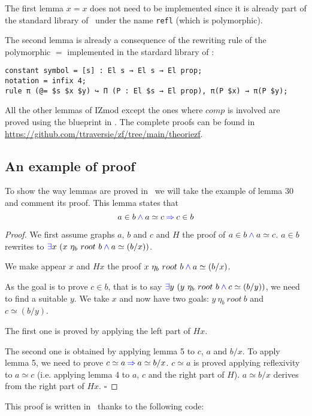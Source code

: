 \documentclass[a4paper]{article}
\begin{document}
The first lemma $x=x$ does not need to be implemented since it is already part of the standard library of \dedukti \ under the name \texttt{refl} (which is polymorphic).

The second lemma is already a consequence of the rewriting rule of the polymorphic $=$ implemented in the stardard library of \dedukti: 
\begin{lstlisting}
constant symbol = [s] : El s → El s → El prop;
notation = infix 4;
rule π (@= $s $x $y) ↪ Π (P : El $s → El prop), π(P $x) → π(P $y);
\end{lstlisting}

All the other lemmas of IZmod except the ones where $comp$ is involved are proved using the blueprint in \cite[see][Proposition 1]{zermodulo53}. The complete proofs can be found in \url{https://github.com/ttraversie/zf/tree/main/theoriezf}.

\subsection{An example of proof}

To show the way lemmas are proved in \dedukti ~we will take the example of lemma 30 and comment its proof. This lemma states that $$ a \in b \mathbin{\color{blue} \wedge} a \simeq c \mathbin{\color{blue} \Rightarrow} c \in b $$

\begin{proof}
We first assume graphs $a$, $b$ and $c$ and $H$ the proof of $ a \in b \mathbin{\color{blue} \wedge} a \simeq c $. $a \in b$ rewrites to ${\color{blue} \exists} x~(x~\eta_b~root~b \mathbin{\color{blue} \wedge} a \simeq (b/x))$. 

We make appear $x$ and $Hx$ the proof $x~\eta_b~root~b \mathbin{\color{blue} \wedge} a \simeq (b/x)$. 

As the goal is to prove $c \in b$, that is to say ${\color{blue} \exists} y~(y~\eta_b~root~b \mathbin{\color{blue} \wedge} c \simeq (b/y))$, we need to find a suitable $y$. We take $x$ and now have two goals: $y~\eta_b~root~b$ and $c \simeq (b/y)$. 

The first one is proved by applying the left part of $Hx$. 

The second one is obtained by applying lemma 5 to $c$, $a$ and $b/x$. To apply lemma 5, we need to prove $c \simeq a \mathbin{\color{blue} \Rightarrow} a \simeq b/x$. $c \simeq a$ is proved applying reflexivity to $a \simeq c$ (i.e. applying lemma 4 to $a$, $c$ and the right part of $H$). $a \simeq b/x$ derives from the right part of $Hx$. $\square$
\end{proof}

This proof is written in \dedukti ~thanks to the following code: 
\end{document}
